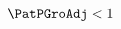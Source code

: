   \begin{equation}\begin{gathered}\begin{aligned}
    \PatPGroAdj  & < 1 \label{eq:GICNrmNrm}
  \end{aligned}\end{gathered}\end{equation}

